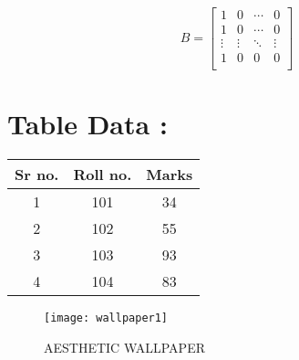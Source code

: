 \documentclass[12pt,a4pages]{article}
\begin{document}
\[B=
\begin{bmatrix}
1&0&\cdots&0\\
1&0&\cdots&0\\
\vdots & \vdots &\ddots &\vdots\\
1&0&0&0 \\
\end{bmatrix}
\]
\newpage
\begin{table}
\section{Table Data :}
\begin{center}
\begin{tabular}{ |c|c|c| } 

\hline

\textbf{Sr no.   }&
\textbf{Roll no.   }&
\textbf{Marks  }\\


 \hline
 1  &  101  &  34 \\
2  &  102  & 55 \\
3  &  103  &  93 \\
4  &  104  &  83 \\

 \hline
\end{tabular}
\end{center}
\end{table}


\newpage
\begin{figure}[h]
\centering
\texttt{[image: wallpaper1]}
\caption{AESTHETIC WALLPAPER}
\end{figure}
\end{document}
